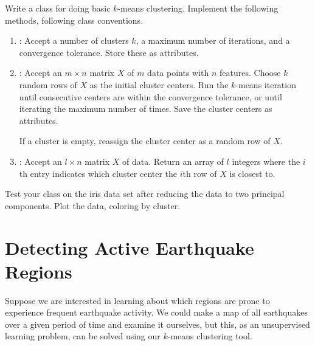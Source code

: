 \begin{problem}
Write a  class for doing basic $k$-means clustering.
Implement the following methods, following  class conventions.
\begin{enumerate}
\item {}: Accept a number of clusters $k$, a maximum number of iterations, and a convergence tolerance.
Store these as attributes.

\item {}: Accept an $m \times n$ matrix $X$ of $m$ data points with $n$ features.
Choose $k$ random rows of $X$ as the initial cluster centers.
Run the $k$-means iteration until consecutive centers are within the convergence tolerance, or until iterating the maximum number of times.
Save the cluster centers as attributes.

If a cluster is empty, reassign the cluster center as a random row of $X$.

\item {}: Accept an $l \times n$ matrix $X$ of data.
Return an array of $l$ integers where the $i$th entry indicates which cluster center the $i$th row of $X$ is closest to.
\end{enumerate}
%
Test your class on the iris data set after reducing the data to two principal components.
Plot the data, coloring by cluster.
\end{problem}

\section*{Detecting Active Earthquake Regions} %

Suppose we are interested in learning about which regions are prone to experience frequent earthquake activity.
We could make a map of all earthquakes over a given period of time and examine it ourselves, but this, as an unsupervised learning problem, can be solved using our $k$-means clustering tool.

